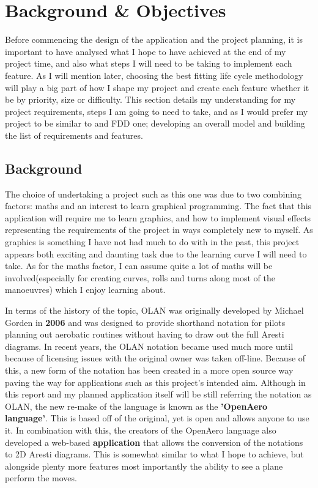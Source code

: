 \chapter{Background \& Objectives}
Before commencing the design of the application and the project planning, it is important to have analysed what I hope to have achieved at the end of my project time, and also what steps I will need to be taking to implement each feature. As I will mention later, choosing the best fitting life cycle methodology will play a big part of how I shape my project and create each feature whether it be by priority, size or difficulty. This section details my understanding for my project requirements, steps I am going to need to take, and as I would prefer my project to be similar to and FDD one; developing an overall model and building the list of requirements and features.

\section{Background}
The choice of undertaking a project such as this one was due to two combining factors: maths and an interest to learn graphical programming. The fact that this application will require me to learn graphics, and how to implement visual effects representing the requirements of the project in ways completely new to myself. As graphics is something I have not had much to do with in the past, this project appears both exciting and daunting task due to the learning curve I will need to take. As for the maths factor, I can assume quite a lot of maths will be involved(especially for creating curves, rolls and turns along most of the manoeuvres) which I enjoy learning about.

In terms of the history of the topic, OLAN was originally developed by Michael Gorden in \textbf{2006} and was designed to provide shorthand notation for pilots planning out aerobatic routines without having to draw out the full Aresti diagrams. In recent years, the OLAN notation became used much more until because of licensing issues with the original owner was taken off-line. Because of this, a new form of the notation has been created in a more open source way paving the way for applications such as this project's intended aim. Although in this report and my planned application itself will be still referring the notation as OLAN, the new re-make of the language is known as the \textbf{'OpenAero language'}. This is based off of the original, yet is open and allows anyone to use it. In combination with this, the creators of the OpenAero language also developed a web-based \textbf{application} that allows the conversion of the notations to 2D Aresti diagrams. This is somewhat similar to what I hope to achieve, but alongside plenty more features most importantly the ability to see a plane perform the moves.

